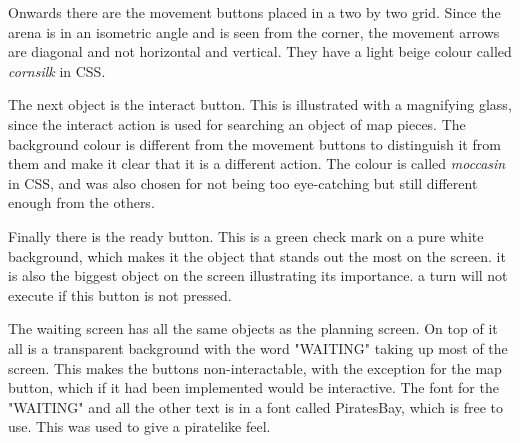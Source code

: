 Onwards there are the movement buttons placed in a two by two grid. Since the arena is in an isometric angle and is seen from the corner, the movement arrows are diagonal and not horizontal and vertical. They have a light beige colour called \textit{cornsilk} in CSS. 

The next object is the interact button. This is illustrated with a magnifying glass, since the interact action is used for searching an object of map pieces. The background colour is different from the movement buttons to distinguish it from them and make it clear that it is a different action. The colour is called \textit{moccasin} in CSS, and was also chosen for not being too eye-catching but still different enough from the others. 

Finally there is the ready button. This is a green check mark on a pure white background, which makes it the object that stands out the most on the screen. it is also the biggest object on the screen illustrating its importance. a turn will not execute if this button is not pressed. 

The waiting screen has all the same objects as the planning screen. On top of it all is a transparent background with the word "WAITING" taking up most of the screen. This makes the buttons non-interactable, with the exception for the map button, which if it had been implemented would be interactive. The font for the "WAITING" and all the other text is in a font called PiratesBay, which is free to use. This was used to give a piratelike feel.